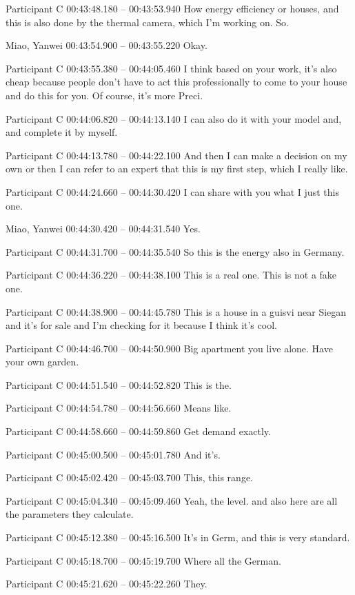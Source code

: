 {Participant C 00:43:48.180 -- 00:43:53.940
How energy efficiency or houses, and this is also done by the thermal camera, which I'm working on. So.

Miao, Yanwei 00:43:54.900 -- 00:43:55.220
Okay.

Participant C 00:43:55.380 -- 00:44:05.460
I think based on your work, it's also cheap because people don't have to act this professionally to come to your house and do this for you. Of course, it's more Preci.

Participant C 00:44:06.820 -- 00:44:13.140
I can also do it with your model and, and complete it by myself.

Participant C 00:44:13.780 -- 00:44:22.100
And then I can make a decision on my own or then I can refer to an expert that this is my first step, which I really like.

Participant C 00:44:24.660 -- 00:44:30.420
I can share with you what I just this one.

Miao, Yanwei 00:44:30.420 -- 00:44:31.540
Yes.

Participant C 00:44:31.700 -- 00:44:35.540
So this is the energy also in Germany.

Participant C 00:44:36.220 -- 00:44:38.100
This is a real one. This is not a fake one.

Participant C 00:44:38.900 -- 00:44:45.780
This is a house in a guisvi near Siegan and it's for sale and I'm checking for it because I think it's cool.

Participant C 00:44:46.700 -- 00:44:50.900
Big apartment you live alone. Have your own garden.

Participant C 00:44:51.540 -- 00:44:52.820
This is the.

Participant C 00:44:54.780 -- 00:44:56.660
Means like.

Participant C 00:44:58.660 -- 00:44:59.860
Get demand exactly.

Participant C 00:45:00.500 -- 00:45:01.780
And it's.

Participant C 00:45:02.420 -- 00:45:03.700
This, this range.

Participant C 00:45:04.340 -- 00:45:09.460
Yeah, the level. and also here are all the parameters they calculate.

Participant C 00:45:12.380 -- 00:45:16.500
It's in Germ, and this is very standard.

Participant C 00:45:18.700 -- 00:45:19.700
Where all the German.

Participant C 00:45:21.620 -- 00:45:22.260
They.

}
